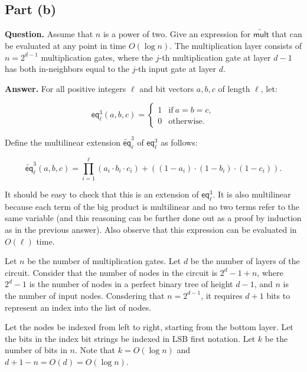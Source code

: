 \documentclass[11pt]{article}
\begin{document}
\subsection{Part (b)}

\textbf{Question.} Assume that $n$ is a power of two. Give an expression for $\widetilde{\mathsf{mult}}$ that can be evaluated at any point in time $O(\log n)$. The multiplication layer consists of $n = 2^{d-1}$ multiplication gates, where the $j$-th multiplication gate at layer $d - 1$ has both in-neighbors equal to the $j$-th input gate at layer $d$.

\textbf{Answer.} For all positive integers $\ell$ and bit vectors $a,b,c$ of length $\ell$, let:

\begin{equation}
	\mathsf{eq}^3_\ell(a, b, c) =
	\begin{cases}
		1 & \text{if}\ a = b = c, \\
		0 & \text{otherwise}.
	\end{cases}
\end{equation}

Define the multilinear extension $\widetilde{\mathsf{eq}}^3_\ell$ of $\mathsf{eq}^3_\ell$ as follows:

\begin{equation}
	\widetilde{\mathsf{eq}}^3_\ell(a, b, c) =
	\prod_{i=1}^\ell (a_i \cdot b_i \cdot c_i) + ((1 - a_i) \cdot (1 - b_i) \cdot (1 - c_i)).
\end{equation}

It should be easy to check that this is an extension of $\mathsf{eq}^3_\ell$.
It is also multilinear because each term of the big product is multilinear and
no two terms refer to the same variable (and this reasoning can be further done out
as a proof by induction as in the previous answer). Also observe that this expression
can be evaluated in $O(\ell)$ time.

Let $n$ be the number of multiplication gates. Let $d$ be the number of layers
of the circuit. Consider that the number of nodes in the circuit is $2^d-1+n$,
where $2^d-1$ is the number of nodes in a perfect binary tree of height $d-1$,
and $n$ is the number of input nodes. Consdering that $n = 2^{d-1}$, it requires
$d+1$ bits to represent an index into the list of nodes.

Let the nodes be indexed from left to right, starting from the bottom layer. 
Let the bits in the index bit strings be indexed in LSB first notation.
Let $k$ be the number of bits
in $n$. Note that $k = O(\log n)$ and $d+1-n = O(d) = O(\log n)$.
\end{document}

